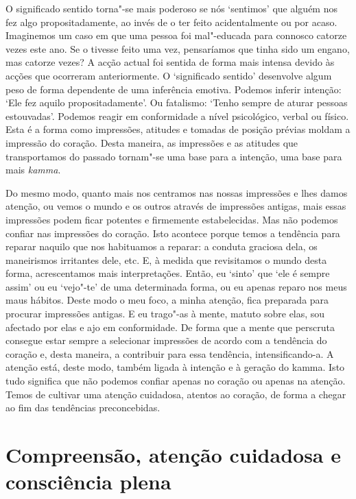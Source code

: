 O significado sentido torna"-se mais poderoso se nós `sentimos' que alguém nos
fez algo propositadamente, ao invés de o ter feito acidentalmente ou por acaso.
Imaginemos um caso em que uma pessoa foi mal"-educada para connosco catorze vezes
este ano. Se o tivesse feito uma vez, pensaríamos que tinha sido um engano, mas
catorze vezes? A acção actual foi sentida de forma mais intensa devido às acções
que ocorreram anteriormente. O `significado sentido' desenvolve algum peso de
forma dependente de uma inferência emotiva. Podemos inferir intenção: `Ele fez
aquilo propositadamente'. Ou fatalismo: `Tenho sempre de aturar pessoas
estouvadas'. Podemos reagir em conformidade a nível psicológico, verbal ou
físico. Esta é a forma como impressões, atitudes e tomadas de posição prévias
moldam a impressão do coração. Desta maneira, as impressões e as atitudes que
transportamos do passado tornam"-se uma base para a intenção, uma base para mais
\emph{kamma}.

Do mesmo modo, quanto mais nos centramos nas nossas impressões e lhes damos
atenção, ou vemos o mundo e os outros através de impressões antigas, mais essas
impressões podem ficar potentes e firmemente estabelecidas. Mas não podemos
confiar nas impressões do coração. Isto acontece porque temos a tendência para
reparar naquilo que nos habituamos a reparar: a conduta graciosa dela, os
maneirismos irritantes dele, etc. E, à medida que revisitamos o mundo desta
forma, acrescentamos mais interpretações. Então, eu `sinto' que `ele é sempre
assim' ou eu `vejo"-te' de uma determinada forma, ou eu apenas reparo nos meus
maus hábitos. Deste modo o meu foco, a minha atenção, fica preparada para
procurar impressões antigas. E eu trago"-as à mente, matuto sobre elas, sou
afectado por elas e ajo em conformidade. De forma que a mente que perscruta
consegue estar sempre a selecionar impressões de acordo com a tendência do
coração e, desta maneira, a contribuir para essa tendência, intensificando-a. A
atenção está, deste modo, também ligada à intenção e à geração do kamma. Isto
tudo significa que não podemos confiar apenas no coração ou apenas na atenção.
Temos de cultivar uma atenção cuidadosa, atentos ao coração, de forma a chegar
ao fim das tendências preconcebidas.

\section{Compreensão, atenção cuidadosa e consciência plena}

